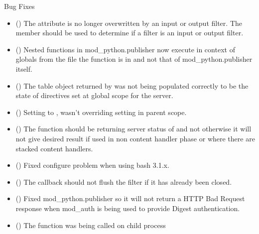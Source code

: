   Bug Fixes

  \begin{itemize}
    \item
      ()
      The  attribute is no longer overwritten by an input
      or output filter. The  member should be used
      to determine if a filter is an input or output filter.
    \item
      ()
      Nested  functions in mod_python.publisher now execute
      in context of globals from the file the function is in and not that
      of mod_python.publisher itself.
    \item
      ()
      The table object returned by  was not
      being populated correctly to be the state of directives set at global
      scope for the server.
    \item
      ()
      Setting  to , wasn't overriding 
      setting in parent scope.
    \item
      ()
      The  function should be returning server status of
       and not  otherwise it will not give
      desired result if used in non content handler phase or where there are
      stacked content handlers.
    \item
      ()
      Fixed configure problem when using bash 3.1.x.
    \item
      ()
      The  callback should not flush the filter if it
      has already been closed.
    \item
      ()
      Fixed mod_python.publisher so it will not return a HTTP Bad Request
      response when mod_auth is being used to provide Digest authentication.
    \item
      ()
      The  function was being called on child process

\end{itemize}
